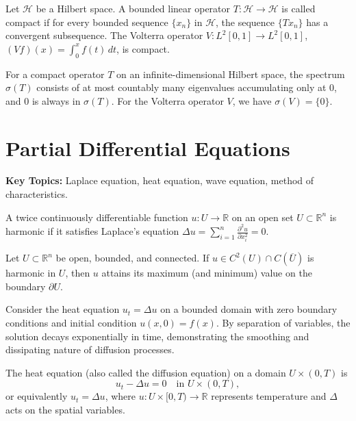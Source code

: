 \begin{example}
Let $\mathcal{H}$ be a Hilbert space. A bounded linear operator $T: \mathcal{H} \to \mathcal{H}$ is called compact if for every bounded sequence $\{x_n\}$ in $\mathcal{H}$, the sequence $\{Tx_n\}$ has a convergent subsequence. The Volterra operator $V: L^2[0,1] \to L^2[0,1]$, $(Vf)(x) = \int_0^x f(t)\,dt$, is compact.
\end{example}

\begin{example}
For a compact operator $T$ on an infinite-dimensional Hilbert space, the spectrum $\sigma(T)$ consists of at most countably many eigenvalues accumulating only at $0$, and $0$ is always in $\sigma(T)$. For the Volterra operator $V$, we have $\sigma(V) = \{0\}$.
\end{example}

\section{Partial Differential Equations}

\textbf{Key Topics:} Laplace equation, heat equation, wave equation, method of characteristics.

\begin{definition}
A twice continuously differentiable function $u: U \to \mathbb{R}$ on an open set $U \subset \mathbb{R}^n$ is harmonic if it satisfies Laplace's equation $\Delta u = \sum_{i=1}^n \frac{\partial^2 u}{\partial x_i^2} = 0$.
\end{definition}

\begin{theorem}
Let $U \subset \mathbb{R}^n$ be open, bounded, and connected. If $u \in C^2(U) \cap C(\overline{U})$ is harmonic in $U$, then $u$ attains its maximum (and minimum) value on the boundary $\partial U$.
\end{theorem}

\begin{example}
Consider the heat equation $u_t = \Delta u$ on a bounded domain with zero boundary conditions and initial condition $u(x,0) = f(x)$. By separation of variables, the solution decays exponentially in time, demonstrating the smoothing and dissipating nature of diffusion processes.
\end{example}

\begin{definition}
The heat equation (also called the diffusion equation) on a domain $U \times (0,T)$ is
\[
u_t - \Delta u = 0 \quad \text{in } U \times (0,T),
\]
or equivalently $u_t = \Delta u$, where $u: U \times [0,T) \to \mathbb{R}$ represents temperature and $\Delta$ acts on the spatial variables.
\end{definition}

